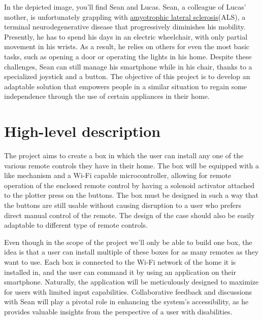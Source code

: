 \begin{minipage}[t]{0.65\textwidth}
    In the depicted image, you'll find Sean and Lucas.
    Sean, a colleague of Lucas' mother, is unfortunately grappling with \href{https://en.wikipedia.org/wiki/ALS}{amyotrophic lateral sclerosis}\footnotemark (ALS), a terminal neurodegenerative disease that progressively diminishes his mobility.
    Presently, he has to spend his days in an electric wheelchair, with only partial movement in his wrists.
    As a result, he relies on others for even the most basic tasks, such as opening a door or operating the lights in his home.
    Despite these challenges, Sean can still manage his smartphone while in his chair, thanks to a specialized joystick and a button.
    The objective of this project is to develop an adaptable solution that empowers people in a similar situation to regain some independence through the use of certain appliances in their home.
\end{minipage}\hfill
\begin{minipage}[t]{0.30\textwidth}
  \centering{}
\end{minipage}

\vspace{-10pt}

\section{High-level description}

The project aims to create a box in which the user can install any one of the various remote controls they have in their home.
The box will be equipped with a  like mechanism and a Wi-Fi capable microcontroller, allowing for remote operation of the enclosed remote control by having a solenoid activator attached to the plotter press on the buttons.
The box must be designed in such a way that the buttons are still usable without causing disruption to a user who prefers direct manual control of the remote.
The design of the case should also be easily adaptable to different type of remote controls.

Even though in the scope of the project we'll only be able to build one box, the idea is that a user can install multiple of these boxes for as many remotes as they want to use.
Each box is connected to the Wi-Fi network of the home it is installed in, and the user can command it by using an application on their smartphone.
Naturally, the application will be meticulously designed to maximize  for users with limited input capabilities.
Collaborative feedback and discussions with Sean will play a pivotal role in enhancing the system's accessibility, as he provides valuable insights from the perspective of a user with disabilities.

